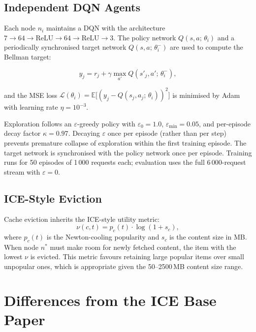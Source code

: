 \documentclass[conference]{IEEEtran}
\begin{document}
\subsection{Independent DQN Agents}

Each node $n_i$ maintains a DQN with the architecture
$7 \to 64 \to \mathrm{ReLU} \to 64 \to \mathrm{ReLU} \to 3$.  The
policy network $Q(s, a;\,\theta_i)$ and a periodically synchronised
target network $Q(s, a;\,\theta_i^-)$ are used to compute the
Bellman target:

\begin{equation}
  y_j = r_j + \gamma \max_{a'} Q(s'_j, a';\,\theta_i^-),
  \label{eq:bellman}
\end{equation}

and the MSE loss $\mathcal{L}(\theta_i) = \mathbb{E}\bigl[(y_j -
Q(s_j, a_j;\,\theta_i))^2\bigr]$ is minimised by Adam with learning
rate $\eta = 10^{-3}$.

Exploration follows an $\varepsilon$-greedy policy with
$\varepsilon_0 = 1.0$, $\varepsilon_{\min} = 0.05$, and per-episode
decay factor $\kappa = 0.97$.  Decaying $\varepsilon$ once per episode
(rather than per step) prevents premature collapse of exploration
within the first training episode.  The target network is synchronised
with the policy network once per episode.  Training runs for 50
episodes of 1\,000 requests each; evaluation uses the full 6\,000-request
stream with $\varepsilon = 0$.

\subsection{ICE-Style Eviction}

Cache eviction inherits the ICE-style utility metric:
\begin{equation}
  \nu(c, t) = p_c(t) \cdot \log(1 + s_c),
  \label{eq:ice_evict}
\end{equation}
where $p_c(t)$ is the Newton-cooling popularity and $s_c$ is the
content size in MB.  When node $n^*$ must make room for newly fetched
content, the item with the lowest $\nu$ is evicted.  This metric
favours retaining large popular items over small unpopular ones,
which is appropriate given the 50--2500\,MB content size range.

\section{Differences from the ICE Base Paper}
\label{sec:differences}
\end{document}
